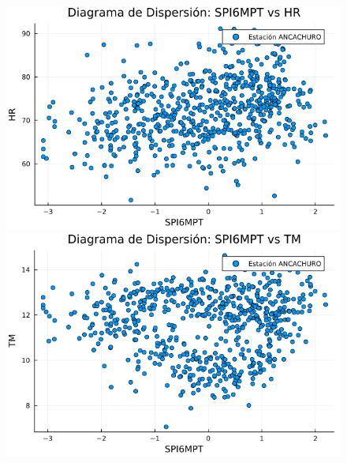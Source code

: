 \begin{figure}[htbp]
\begin{minipage}{0.32\textwidth}
\end{minipage}

\vspace{0.5cm}  %

\begin{minipage}{0.32\textwidth}
    \centering
    \includegraphics[width=\linewidth]{Capitulos/Scaterplot/ANCACHURO_SPI6MPT_vs_HR.png}
\end{minipage}\hfill
\begin{minipage}{0.32\textwidth}
    \centering
    \includegraphics[width=\linewidth]{Capitulos/Scaterplot/ANCACHURO_SPI6MPT_vs_TM.png}
\end{minipage}\hfill
\begin{minipage}{0.32\textwidth}
    \centering

\end{minipage}
\end{figure}

